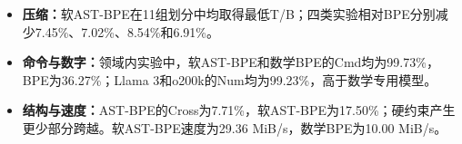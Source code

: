 \begin{itemize}
\item \textbf{压缩：}软AST-BPE在11组划分中均取得最低T/B；四类实验相对BPE分别减少7.45\%、7.02\%、8.54\%和6.91\%。
\item \textbf{命令与数字：}领域内实验中，软AST-BPE和数学BPE的Cmd均为99.73\%，BPE为36.27\%；Llama 3和o200k的Num均为99.23\%，高于数学专用模型。
\item \textbf{结构与速度：}AST-BPE的Cross为7.71\%，软AST-BPE为17.50\%；硬约束产生更少部分跨越。软AST-BPE速度为29.36 MiB/s，数学BPE为10.00 MiB/s。
\end{itemize}
